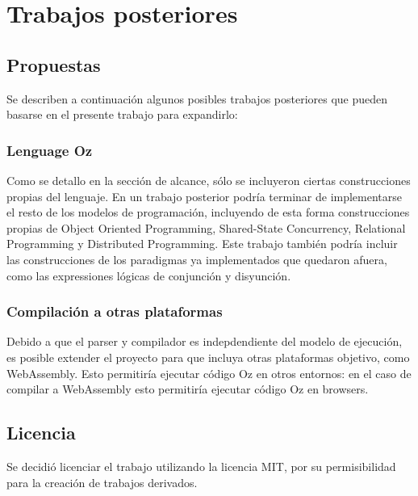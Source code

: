\documentclass[a4paper,11pt]{article}
\begin{document}
\section{Trabajos posteriores}

\subsection{Propuestas}

Se describen a continuación algunos posibles trabajos posteriores que pueden basarse en el presente trabajo para expandirlo:

\subsubsection{Lenguage Oz}

Como se detallo en la sección de alcance, sólo se incluyeron ciertas construcciones propias del lenguaje. En un trabajo posterior podría terminar de implementarse el resto de los modelos de programación, incluyendo de esta forma construcciones propias de Object Oriented Programming, Shared-State Concurrency, Relational Programming y Distributed Programming. Este trabajo también podría incluir las construcciones de los paradigmas ya implementados que quedaron afuera, como las expressiones lógicas de conjunción y disyunción.

\subsubsection{Compilación a otras plataformas}

Debido a que el parser y compilador es indepdendiente del modelo de ejecución, es posible extender el proyecto para que incluya otras plataformas objetivo, como WebAssembly\cite{wasm}. Esto permitiría ejecutar código Oz en otros entornos: en el caso de compilar a WebAssembly esto permitiría ejecutar código Oz en browsers.


\subsection{Licencia}

Se decidió licenciar el trabajo utilizando la licencia MIT\cite{mit}, por su permisibilidad para la creación de trabajos derivados.
\end{document}
